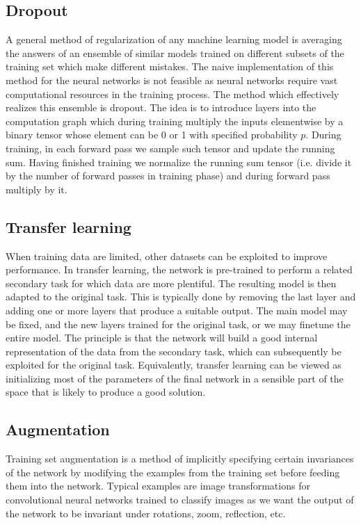 \documentclass{myclass}
\begin{document}
\subsection{Dropout}

A general method of regularization of any machine learning model is averaging the answers of an
ensemble of similar models trained on different subsets of the training set which make different
mistakes. The naive implementation of this method for the neural networks is not feasible as neural
networks require vast computational resources in the training process. The method which effectively
realizes this ensemble is dropout. The idea is to introduce layers into the computation graph which
during training multiply the inputs elementwise by a binary tensor whose element can be 0 or 1 with
specified probability \(p\). During training, in each forward pass we sample such tensor and update
the running sum. Having finished training we normalize the running sum tensor (i.e. divide it by the
number of forward passes in training phase) and during forward pass multiply by it.


\subsection{Transfer learning}

When training data are limited, other datasets can be exploited to improve performance. In transfer
learning, the network is pre-trained to perform a related secondary task for which data are more
plentiful. The resulting model is then adapted to the original task. This is typically done by
removing the last layer and adding one or more layers that produce a suitable output. The main model
may be fixed, and the new layers trained for the original task, or we may finetune the entire model.
The principle is that the network will build a good internal representation of the data from the
secondary task, which can subsequently be exploited for the original task. Equivalently, transfer
learning can be viewed as initializing most of the parameters of the final network in a sensible
part of the space that is likely to produce a good solution.


\subsection{Augmentation}

Training set augmentation is a method of implicitly specifying certain invariances of the network by
modifying the examples from the training set before feeding them into the network. Typical examples
are image transformations for convolutional neural networks trained to classify images as we want
the output of the network to be invariant under rotations, zoom, reflection, etc.
\end{document}
